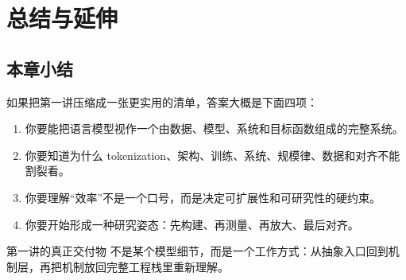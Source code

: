 \section{总结与延伸}

\subsection{本章小结}

如果把第一讲压缩成一张更实用的清单，答案大概是下面四项：
\begin{enumerate}
    \item 你要能把语言模型视作一个由数据、模型、系统和目标函数组成的完整系统。
    \item 你要知道为什么 tokenization、架构、训练、系统、规模律、数据和对齐不能割裂看。
    \item 你要理解“效率”不是一个口号，而是决定可扩展性和可研究性的硬约束。
    \item 你要开始形成一种研究姿态：先构建、再测量、再放大、最后对齐。
\end{enumerate}

\begin{importantbox}{第一讲的真正交付物}
不是某个模型细节，而是一个工作方式：从抽象入口回到机制层，再把机制放回完整工程栈里重新理解。
\end{importantbox}



